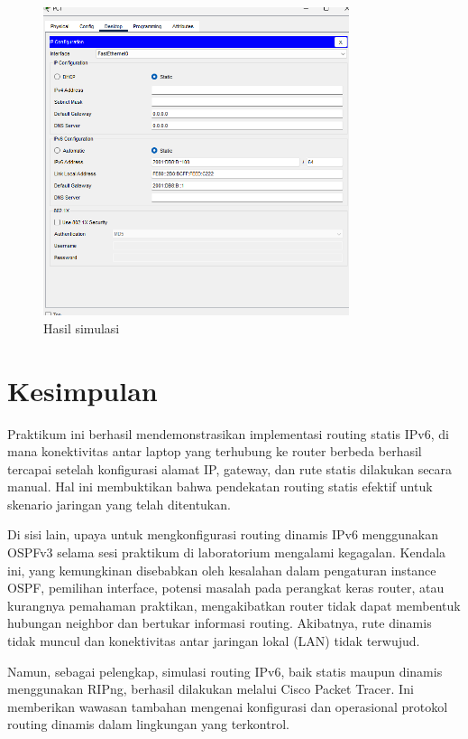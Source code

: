 \begin{figure}
    \centering
    \includegraphics[width=0.8\textwidth]{P1/img/tumodsimulasip4.png}
    \caption{Hasil simulasi}
    \label{fig:hasil_routing_dinamis_ipv6_2}
\end{figure}


\section{Kesimpulan}Praktikum ini berhasil mendemonstrasikan implementasi routing statis IPv6, di mana konektivitas antar laptop yang terhubung ke router berbeda berhasil tercapai setelah konfigurasi alamat IP, gateway, dan rute statis dilakukan secara manual. Hal ini membuktikan bahwa pendekatan routing statis efektif untuk skenario jaringan yang telah ditentukan.

Di sisi lain, upaya untuk mengkonfigurasi routing dinamis IPv6 menggunakan OSPFv3 selama sesi praktikum di laboratorium mengalami kegagalan. Kendala ini, yang kemungkinan disebabkan oleh kesalahan dalam pengaturan instance OSPF, pemilihan interface, potensi masalah pada perangkat keras router, atau kurangnya pemahaman praktikan, mengakibatkan router tidak dapat membentuk hubungan neighbor dan bertukar informasi routing. Akibatnya, rute dinamis tidak muncul dan konektivitas antar jaringan lokal (LAN) tidak terwujud.

Namun, sebagai pelengkap, simulasi routing IPv6, baik statis maupun dinamis menggunakan RIPng, berhasil dilakukan melalui Cisco Packet Tracer. Ini memberikan wawasan tambahan mengenai konfigurasi dan operasional protokol routing dinamis dalam lingkungan yang terkontrol.

